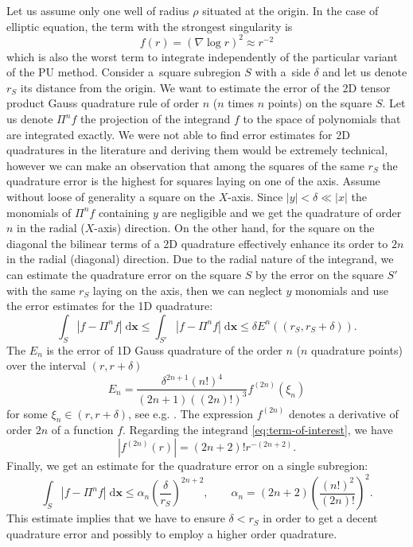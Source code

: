\documentclass{elsarticle}
\def\vc#1{\mathbf{\boldsymbol{#1}}}     %
\def\abs#1{\left|#1\right|}
\def\abs#1{| #1 |}
\newcommand{\dd}{\; \mathrm{d}}
\newcommand{\bx}{\vc{x}}
\begin{document}
Let us assume only one well of radius $\rho$ situated at the origin. In the case of elliptic equation, the term with the strongest singularity is 
\begin{equation}
    \label{eq:term-of-interest}
    f(r)=(\nabla \log r )^2 \approx r^{-2}
\end{equation}
which is also the worst term to integrate independently of the particular variant of the PU method.
Consider a~square subregion $S$ with a~side $\delta$ and 
let us denote $r_{S}$ its distance from the origin.
We want to estimate the error of the 2D tensor product Gauss quadrature rule of order $n$ ($n$ times $n$ points) on the square $S$. 
Let us denote 
$\Pi^n f$ the projection of the integrand $f$ to the space of polynomials that are integrated exactly.
We were not able to find error estimates for 2D quadratures in the literature and deriving them would be extremely technical,  
however we can make an observation that among the squares of the same $r_{S}$ the quadrature error is the highest for squares laying on one of the axis.
Assume without loose of generality a square on the $X$-axis. Since $\abs{y}<\delta \ll \abs{x}$ the monomials of $\Pi^n f$ containing $y$ 
are negligible and we get the quadrature
of order $n$ in the radial ($X$-axis) direction. On the other hand, for the square on the diagonal the bilinear terms of 
a 2D quadrature effectively enhance its order to $2n$ in the radial (diagonal) direction. Due to the radial nature of the integrand,
we can estimate the quadrature error on the square $S$ by the error on the square $S'$ with the same $r_S$ laying on the axis, then we can 
neglect $y$ monomials and use the error estimates for the 1D quadrature:
\[
  \int_S \abs{f-\Pi^n f} \dd\bx \le \int_{S'}\abs{f-\Pi^n f} \dd\bx \le \delta E^n((r_{S}, r_{S}+\delta)).
\]
The $E_n$ is the error of 1D Gauss quadrature of the order $n$ ($n$ quadrature points) over the interval $(r,r+\delta)$
\[
  E_n = \frac{\delta^{2n+1} (n!)^4}{(2n+1)((2n)!)^3} f^{(2n)}(\xi_n) 
\]
for some $\xi_n \in (r, r+\delta)$, see e.g. \cite{kahaner_numerical_1989}. 
The expression $f^{(2n)}$ denotes a derivative of order $2n$ of a function $f$.
Regarding the integrand \eqref{eq:term-of-interest}, we have 
\[
  \abs{f^{(2n)}(r)} = (2n+2)! r^{-(2n+2)}.
\]
Finally, we get an estimate for the quadrature error on a single subregion:
\[
    \int_S \abs{f-\Pi^n f}  \dd\bx \le  \alpha_n \left( \frac{\delta}{r_{S}} \right)^{2n+2}, 
  \qquad \alpha_n = (2n+2)\left( \frac{(n!)^2}{(2n)!} \right)^2.
\]
This estimate implies that we have to ensure $\delta < r_S$ in order to get a decent quadrature error 
and possibly to employ a higher order quadrature. 
\end{document}
